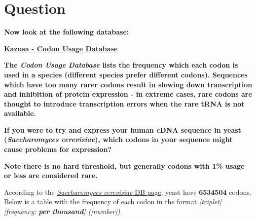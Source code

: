 \section{Question}

\large{\textbf{Now look at the following database:}}

\large{\textbf{\href{http://www.kazusa.or.jp/codon/}{Kazusa - Codon Usage Database}}}

\large{\textbf{The \textit{Codon Usage Database} lists the frequency which each codon is used in a species (different species prefer different codons). Sequences which have too many rarer codons result in slowing down transcription and inhibition of protein expression - in extreme cases, rare codons are thought to introduce transcription errors when the rare tRNA is not available.}}

\large{\textbf{If you were to try and express your human cDNA sequence in yeast (\textit{Saccharomyces cerevisiae}), which codons in your sequence might cause problems for expression?}}

\textbf{Note there is no hard threshold, but generally codons with 1\% usage or less are considered rare.}

\bigskip

According to the \href{http://www.kazusa.or.jp/codon/cgi-bin/showcodon.cgi?species=4932}{\textit{Saccharomyces cerevisiae} DB page}, yeast have \textbf{6534504} codons. Below is a table with the frequency of each codon in the format \textit{[triplet] [frequency: \textbf{per thousand}] ([number])}.


